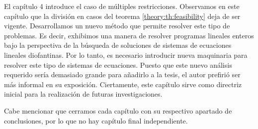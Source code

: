 El capítulo 4 introduce el caso de múltiples restricciones. Observamos en este capítulo que la
división en casos del teorema \ref{theory:th:feasibility} deja de ser vigente. Desarrollamos un
nuevo método que permite resolver este tipo de problemas. Es decir, exhibimos una manera de resolver
programas lineales enteros bajo la perspectiva de la búsqueda de soluciones de sistemas de
ecuaciones lineales diofantinas. Por lo tanto, es necesario introducir nueva maquinaria para resolver
este tipo de sistemas de ecuaciones. Puesto que este nuevo análisis requerido sería demasiado grande
para añadirlo a la tesis, el autor prefirió ser más informal en su exposición. Ciertamente, este
capítulo sirve como directriz inicial para la realización de futuras investigaciones.

Cabe mencionar que cerramos cada capítulo con su respectivo apartado de conclusiones, por lo que no
hay capítulo final independiente.
